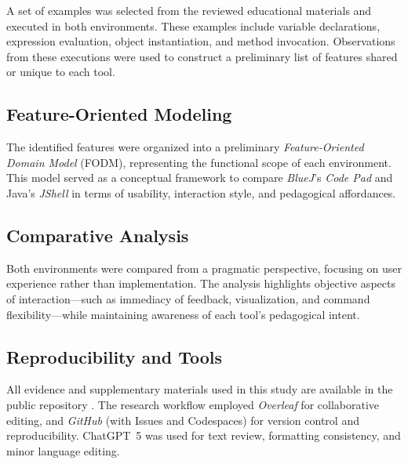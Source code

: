 \documentclass{article}
\begin{document}
A set of examples was selected from the reviewed educational materials and executed in both environments. These examples include variable declarations, expression evaluation, object instantiation, and method invocation. Observations from these executions were used to construct a preliminary list of features shared or unique to each tool.

\subsection{Feature-Oriented Modeling}

The identified features were organized into a preliminary \textit{Feature-Oriented Domain Model} (FODM), representing the functional scope of each environment. This model served as a conceptual framework to compare \textit{BlueJ}’s \textit{Code Pad} and Java’s \textit{JShell} in terms of usability, interaction style, and pedagogical affordances.

\subsection{Comparative Analysis}

Both environments were compared from a pragmatic perspective, focusing on user experience rather than implementation. The analysis highlights objective aspects of interaction—such as immediacy of feedback, visualization, and command flexibility—while maintaining awareness of each tool’s pedagogical intent.

\subsection{Reproducibility and Tools}

All evidence and supplementary materials used in this study are available in the public repository \cite{mangan2025codepadjshell}. The research workflow employed \textit{Overleaf} for collaborative editing, and \textit{GitHub} (with Issues and Codespaces) for version control and reproducibility. ChatGPT~5 was used for text review, formatting consistency, and minor language editing.



\end{document}
